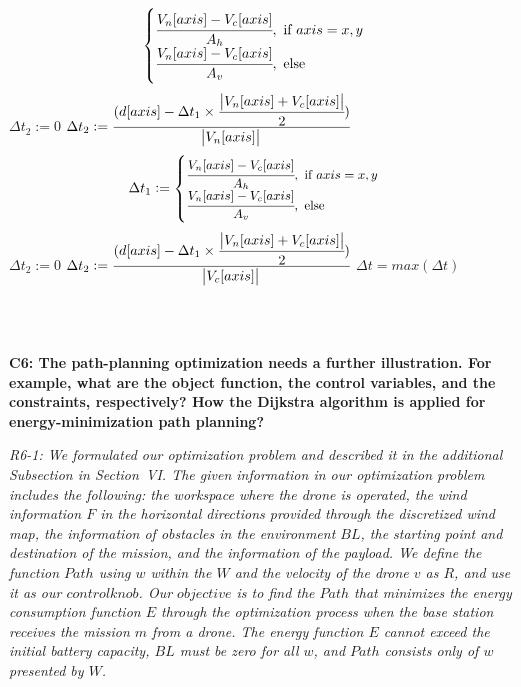 \documentclass[onecolumn]{IEEEconf}
\begin{document}
\begin{description}
\begin{algorithm}[htp]
{{\begin{equation*}
{\begin{cases}
\cfrac{V_n[axis] - V_c[axis]}{A_h},~\text{if $axis = x,y$}\\
\cfrac{V_n[axis] - V_c[axis]}{A_v},~\text{else}\\
\end{cases}
}
\end{equation*}
{
    $\Delta t_2 := 0$
}
\Else
{
    $\Delta t_2 := \cfrac{(d[axis] - \Delta t_1 \times \cfrac{\abs{V_n[axis] + V_c[axis]}}{2})}{\abs{V_n[axis]}}$
}
}
\Else
{
    \begin{equation*}
        \small{
        \Delta t_1 := 
        \begin{cases}
            \cfrac{V_n[axis] - V_c[axis]}{A_h},~\text{if $axis = x,y$}\\
            \cfrac{V_n[axis] - V_c[axis]}{A_v},~\text{else}\\
        \end{cases}
        }
    \end{equation*}
    {
        $\Delta t_2 := 0$
    }
    \Else
    {
            $\Delta t_2 := \cfrac{(d[axis] - \Delta t_1 \times \cfrac{\abs{V_n[axis] + V_c[axis]}}{2})}{\abs{V_c[axis]}}$
    }
}
}
\Return $\Delta t = max(\Delta t)$
\end{algorithm}
\SetNlSty{}{\color{black}}{:}
\SetAlFnt{\color{black}}
~\\~\\
    \item \textbf
    {
	C6: The path-planning optimization needs a further illustration.  For example, what are the object function, the control variables, and the constraints, respectively?  How the Dijkstra algorithm is applied for energy-minimization path planning? 
	}
	\item \textit
	{
    R6-1: We formulated our optimization problem and described it in the additional Subsection in Section~VI. The given information in our optimization problem includes the following: the workspace where the drone is operated, the wind information $F$ in the horizontal directions provided through the discretized wind map, the information of obstacles in the environment $BL$, the starting point and destination of the mission, and the information of the payload. We define the function $Path$ using $w$ within the $W$ and the velocity of the drone $v$ as $R$, and use it as our $control knob$. Our $objective$ is to find the $Path$ that minimizes the energy consumption function $E$ through the optimization process when the base station receives the mission $m$ from a drone. The energy function $E$ cannot exceed the initial battery capacity, $BL$ must be zero for all $w$, and $Path$ consists only of $w$ presented by $W$.
}
\end{description}
\end{document}
